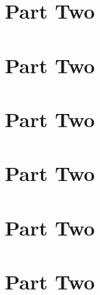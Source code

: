 \documentclass[11pt,fleqn]{book}
\begin{document}
\newpage



\part{Part Two}
\part{Part Two}
\part{Part Two}
\part{Part Two}
\part{Part Two}
\part{Part Two}


% 




\cleardoublepage
{}
\setlength{\columnsep}{0.75cm}
\printindex
\end{document}
